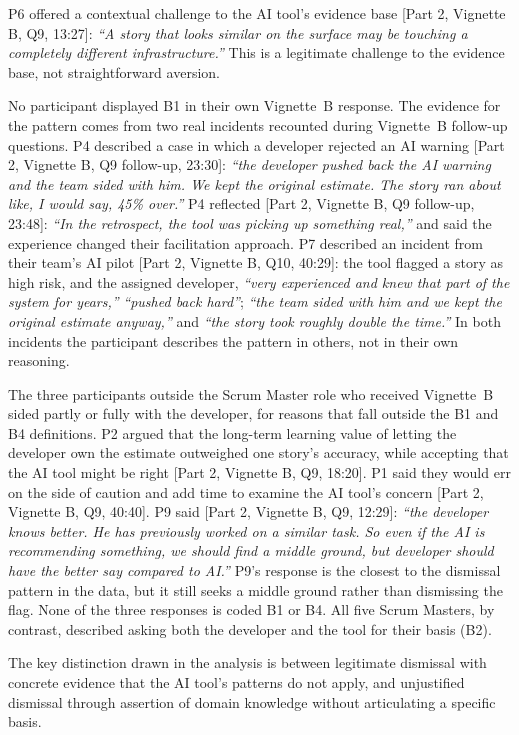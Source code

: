 \documentclass[a4paper,twoside]{bth}
\begin{document}
P6 offered a contextual challenge to the AI tool's evidence base [Part 2, Vignette B, Q9, 13:27]: \textit{``A story that looks similar on the surface may be touching a completely different infrastructure.''} This is a legitimate challenge to the evidence base, not straightforward aversion.

No participant displayed B1 in their own Vignette~B response. The evidence for the pattern comes from two real incidents recounted during Vignette~B follow-up questions. P4 described a case in which a developer rejected an AI warning [Part 2, Vignette B, Q9 follow-up, 23:30]: \textit{``the developer pushed back the AI warning and the team sided with him. We kept the original estimate. The story ran about like, I would say, 45\% over.''} P4 reflected [Part 2, Vignette B, Q9 follow-up, 23:48]: \textit{``In the retrospect, the tool was picking up something real,''} and said the experience changed their facilitation approach. P7 described an incident from their team's AI pilot [Part 2, Vignette B, Q10, 40:29]: the tool flagged a story as high risk, and the assigned developer, \textit{``very experienced and knew that part of the system for years,''} \textit{``pushed back hard''}; \textit{``the team sided with him and we kept the original estimate anyway,''} and \textit{``the story took roughly double the time.''} In both incidents the participant describes the pattern in others, not in their own reasoning.

The three participants outside the Scrum Master role who received Vignette~B sided partly or fully with the developer, for reasons that fall outside the B1 and B4 definitions. P2 argued that the long-term learning value of letting the developer own the estimate outweighed one story's accuracy, while accepting that the AI tool might be right [Part 2, Vignette B, Q9, 18:20]. P1 said they would err on the side of caution and add time to examine the AI tool's concern [Part 2, Vignette B, Q9, 40:40]. P9 said [Part 2, Vignette B, Q9, 12:29]: \textit{``the developer knows better. He has previously worked on a similar task. So even if the AI is recommending something, we should find a middle ground, but developer should have the better say compared to AI.''} P9's response is the closest to the dismissal pattern in the data, but it still seeks a middle ground rather than dismissing the flag. None of the three responses is coded B1 or B4. All five Scrum Masters, by contrast, described asking both the developer and the tool for their basis (B2).

The key distinction drawn in the analysis is between legitimate dismissal with concrete evidence that the AI tool's patterns do not apply, and unjustified dismissal through assertion of domain knowledge without articulating a specific basis.
\end{document}
